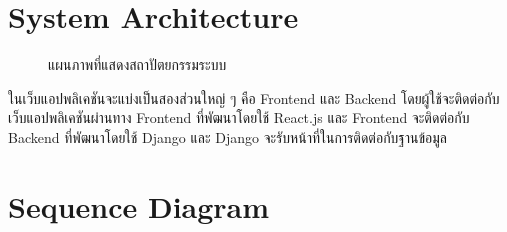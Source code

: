 \documentclass[12pt,oneside,openright,a4paper]{cpe-thai-project}
\begin{document}
\pagebreak
\section{System Architecture}

\begin{figure}[!h]\centering
	\caption{แผนภาพที่แสดงสถาปัตยกรรมระบบ}\label{fig:UseCaseDiagram}
\end{figure}

\hspace{1cm}
ในเว็บแอปพลิเคชันจะแบ่งเป็นสองส่วนใหญ่ ๆ คือ Frontend และ Backend โดยผู้ใช้จะติดต่อกับเว็บแอปพลิเคชันผ่านทาง
Frontend ที่พัฒนาโดยใช้ React.js และ Frontend จะติดต่อกับ Backend ที่พัฒนาโดยใช้ Django และ Django
จะรับหน้าที่ในการติดต่อกับฐานข้อมูล

\pagebreak
\section{Sequence Diagram}
\end{document}
